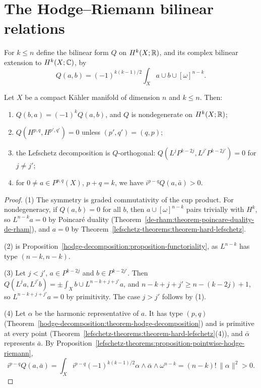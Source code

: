 \section{The Hodge--Riemann bilinear relations}\label{lefschetz-theorems:section-hodge-riemann}

\begin{definition}\label{lefschetz-theorems:definition-q}
For $k \leq n$ define the bilinear form $Q$ on $H^k(X; \mathbb{R})$, and its complex bilinear extension to $H^k(X; \mathbb{C})$, by
\[
Q(a, b) = (-1)^{k(k-1)/2}\int_Xa \cup b \cup [\omega]^{n-k} .
\]
\end{definition}

\begin{theorem}\label{lefschetz-theorems:theorem-hodge-riemann}
Let $X$ be a compact K\"ahler manifold of dimension $n$ and $k \leq n$. Then:
\begin{enumerate}
\item $Q(b, a) = (-1)^kQ(a, b)$, and $Q$ is nondegenerate on $H^k(X; \mathbb{R})$;
\item $Q(H^{p,q}, H^{p',q'}) = 0$ unless $(p', q') = (q, p)$;
\item the Lefschetz decomposition is $Q$-orthogonal: $Q(L^jP^{k-2j}, L^{j'}P^{k-2j'}) = 0$ for $j \neq j'$;
\item for $0 \neq a \in P^{p,q}(X)$, $p + q = k$, we have $i^{p-q}Q(a, \bar a) > 0$.
\end{enumerate}
\end{theorem}

\begin{proof}
(1) The symmetry is graded commutativity of the cup product. For nondegeneracy, if $Q(a, b) = 0$ for all $b$, then $a \cup [\omega]^{n-k}$
pairs trivially with $H^k$, so $L^{n-k}a = 0$ by Poincar\'e duality (Theorem~\ref{de-rham:theorem-poincare-duality-de-rham}), and $a = 0$ by
Theorem~\ref{lefschetz-theorems:theorem-hard-lefschetz}.

(2) is Proposition~\ref{hodge-decomposition:proposition-functoriality}, as $L^{n-k}$ has type $(n-k, n-k)$.

(3) Let $j < j'$, $a \in P^{k-2j}$ and $b \in P^{k-2j'}$. Then $Q(L^ja, L^{j'}b) = \pm\int_Xb \cup L^{n-k+j+j'}a$, and
$n - k + j + j' \geq n - (k - 2j) + 1$, so $L^{n-k+j+j'}a = 0$ by primitivity. The case $j > j'$ follows by (1).

(4) Let $\alpha$ be the harmonic representative of $a$. It has type $(p,q)$ (Theorem~\ref{hodge-decomposition:theorem-hodge-decomposition})
and is primitive at every point (Theorem~\ref{lefschetz-theorems:theorem-hard-lefschetz}(4)), and $\bar\alpha$ represents $\bar a$. By
Proposition~\ref{lefschetz-theorems:proposition-pointwise-hodge-riemann},
\[
i^{p-q}Q(a, \bar a) = \int_Xi^{p-q}(-1)^{k(k-1)/2}\alpha \wedge \bar\alpha \wedge \omega^{n-k} = (n-k)!\,\|\alpha\|^2 > 0 .
\]
\end{proof}


